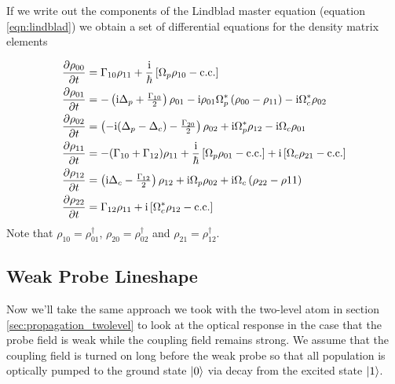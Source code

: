     If we write out the components of the Lindblad master equation (equation
    \ref{eqn:lindblad}) we obtain a set of differential equations for the
    density matrix elements

    \begin{subequations}
    \begin{align}
      \frac{\partial \rho_{00}}{\partial t} &= \Gamma_{10} \rho_{11} + 
      \frac{\mathrm{i}}{\hbar} \left[ \Omega_p \rho_{10} - \mathrm{c.c.} \right] \\
      \frac{\partial \rho_{01}}{\partial t} &= - \left(\mathrm{i} \Delta_p + 
      \tfrac{\Gamma_{10}}{2} \right) \rho_{01} - \mathrm{i} \rho_{01} \Omega^*_p 
      \left( \rho_{00} - \rho_{11} \right) - \mathrm{i} \Omega^*_c \rho_{02} \\
      \frac{\partial \rho_{02}}{\partial t} &= \left( - 
      \mathrm{i} (\Delta_p - \Delta_c) - \tfrac{\Gamma_{20}}{2} \right) \rho_{02} + 
      \mathrm{i} \Omega^*_p \rho_{12} - \mathrm{i} \Omega_c \rho_{01} \\
      \frac{\partial \rho_{11}}{\partial t} &= -(\Gamma_{10} + \Gamma_{12}) 
      \rho_{11} + \frac{\mathrm{i}}{\hbar} \left[ \Omega_p \rho_{01} - \mathrm{c.c.} \right] + 
      \mathrm{i} \left[ \Omega_c \rho_{21} - \mathrm{c.c.} \right] \\
      \frac{\partial \rho_{12}}{\partial t} &= \left(\mathrm{i} \Delta_c - 
      \tfrac{\Gamma_{12}}{2} \right) \rho_{12} + \mathrm{i} \Omega_p \rho_{02} + 
      \mathrm{i} \Omega_c \left( \rho_{22} - \rho{11} \right) \\
      \frac{\partial \rho_{22}}{\partial t} &= \Gamma_{12} \rho_{11} + 
      \mathrm{i} \left[ \Omega^*_c \rho_{12} - \mathrm{c.c.} \right]
    \end{align}
    \label{eqn:lambda_dm_equations}
    \end{subequations}
    Note that $\rho_{10} = \rho_{01}^\dagger$, $\rho_{20} = \rho_{02}^\dagger$
    and $\rho_{21} =\rho_{12}^\dagger$.

  \subsection{Weak Probe Lineshape}

    Now we'll take the same approach we took with the two-level atom in section
    \ref{sec:propagation_twolevel} to look at the optical response in the case
    that the probe field is weak while the coupling field remains strong. We
    assume that the coupling field is turned on long before the weak probe so
    that all population is optically pumped to the ground state $\Ket{0}$ via
    decay from the excited state $\Ket{1}$.

